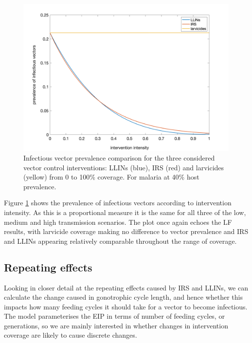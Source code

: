 \begin{figure}[ht]
\begin{center}
\includegraphics[height=8cm]{Project/Figures/VectorModel/Malaria/VecPrev_lowmidhigh_new.png}
\caption[Vector prevalence (malaria).]{Infectious vector prevalence comparison for the three considered vector control interventions: LLINs (blue), IRS (red) and larvicides (yellow) from 0 to 100\% coverage. For malaria at 40\% host prevalence.}
\label{fig:VecPrev_Ma}
\end{center}
\end{figure}

Figure \ref{fig:VecPrev_Ma} shows the prevalence of infectious vectors according to intervention intensity. As this is a proportional measure it is the same for all three of the low, medium and high transmission scenarios. The plot once again echoes the LF results, with larvicide coverage making no difference to vector prevalence and IRS and LLINs appearing relatively comparable throughout the range of coverage.

\subsection{Repeating effects}

Looking in closer detail at the repeating effects caused by IRS and LLINs, we can calculate the change caused in gonotrophic cycle length, and hence whether this impacts how many feeding cycles it should take for a vector to become infectious. The model parameterises the EIP in terms of number of feeding cycles, or generations, so we are mainly interested in whether changes in intervention coverage are likely to cause discrete changes.

